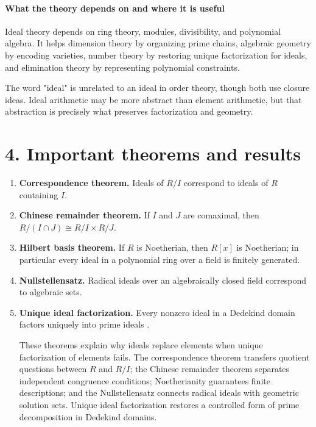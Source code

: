 \paragraph{What the theory depends on and where it is useful}
Ideal theory depends on ring theory, modules, divisibility, and polynomial algebra. It helps dimension theory by organizing prime chains, algebraic geometry by encoding varieties, number theory by restoring unique factorization for ideals, and elimination theory by representing polynomial constraints.

The word "ideal" is unrelated to an ideal in order theory, though both use closure ideas. Ideal arithmetic may be more abstract than element arithmetic, but that abstraction is precisely what preserves factorization and geometry.

\section*{4. Important theorems and results}
\begin{enumerate}[leftmargin=*,itemsep=0.35em]
\item \textbf{Correspondence theorem.} Ideals of $R/I$ correspond to ideals of $R$ containing $I$.

\item \textbf{Chinese remainder theorem.} If $I$ and $J$ are comaximal, then $R/(I\cap J)\cong R/I\times R/J$.

\item \textbf{Hilbert basis theorem.} If $R$ is Noetherian, then $R[x]$ is Noetherian; in particular every ideal in a polynomial ring over a field is finitely generated.

\item \textbf{Nullstellensatz.} Radical ideals over an algebraically closed field correspond to algebraic sets.

\item \textbf{Unique ideal factorization.} Every nonzero ideal in a Dedekind domain factors uniquely into prime ideals \cite{ideal_theory_ref4}.

These theorems explain why ideals replace elements when unique factorization of elements fails. The correspondence theorem transfers quotient questions between $R$ and $R/I$; the Chinese remainder theorem separates independent congruence conditions; Noetherianity guarantees finite descriptions; and the Nullstellensatz connects radical ideals with geometric solution sets. Unique ideal factorization restores a controlled form of prime decomposition in Dedekind domains.
\end{enumerate}

